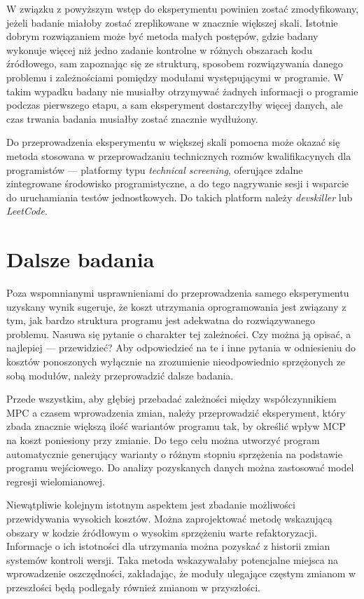 W związku z powyższym wstęp do eksperymentu powinien zostać zmodyfikowany,
jeżeli badanie miałoby zostać zreplikowane w znacznie większej skali.
Istotnie dobrym rozwiązaniem może być metoda małych postępów, gdzie
badany wykonuje więcej niż jedno zadanie kontrolne w różnych obszarach kodu
źródłowego, sam zapoznając się ze strukturą, sposobem rozwiązywania danego
problemu i zależnościami pomiędzy modułami występującymi w programie.
W takim wypadku badany nie musiałby otrzymywać żadnych informacji o programie
podczas pierwszego etapu, a sam eksperyment dostarczyłby więcej danych,
ale czas trwania badania musiałby zostać znacznie wydłużony.

Do przeprowadzenia eksperymentu w większej skali pomocna może okazać się
metoda stosowana w przeprowadzaniu technicznych rozmów kwalifikacynych
dla programistów --- platformy typu \textit{technical screening}, oferujące
zdalne zintegrowane środowisko programistyczne, a do tego nagrywanie sesji
i wsparcie do uruchamiania testów jednostkowych.
Do takich platform należy \textit{devskiller} lub \textit{LeetCode}.

\section{Dalsze badania}

Poza wspomnianymi usprawnieniami do przeprowadzenia samego eksperymentu
uzyskany wynik sugeruje, że koszt utrzymania oprogramowania jest związany z tym,
jak bardzo struktura programu jest adekwatna do rozwiązywanego problemu.
Nasuwa się pytanie o charakter tej zależności.
Czy można ją opisać, a najlepiej --- przewidzieć?
Aby odpowiedzieć na te i inne pytania w odniesieniu do kosztów ponoszonych
wyłącznie na zrozumienie nieodpowiednio sprzężonych ze sobą modułów, należy
przeprowadzić dalsze badania.

Przede wszystkim, aby głębiej przebadać zależności między współczynnikiem
\acrshort{MPC} a czasem wprowadzenia zmian, należy przeprowadzić eksperyment,
który zbada znacznie większą ilość wariantów programu tak, by określić wpływ
MCP na koszt poniesiony przy zmianie.
Do tego celu można utworzyć program automatycznie generujący warianty o różnym
stopniu sprzężenia na podstawie programu wejściowego.
Do analizy pozyskanych danych można zastosować model regresji wielomianowej.

Niewątpliwie kolejnym istotnym aspektem jest zbadanie możliwości przewidywania
wysokich kosztów.
Można zaprojektować metodę wskazującą obszary w kodzie źródłowym o wysokim
sprzężeniu warte refaktoryzacji.
Informacje o ich istotności dla utrzymania można pozyskać z historii zmian
systemów kontroli wersji.
Taka metoda wskazywałaby potencjalne miejsca na wprowadzenie oszczędności,
zakładając, że moduły ulegające częstym zmianom w przeszłości będą podlegały
również zmianom w przyszłości.

